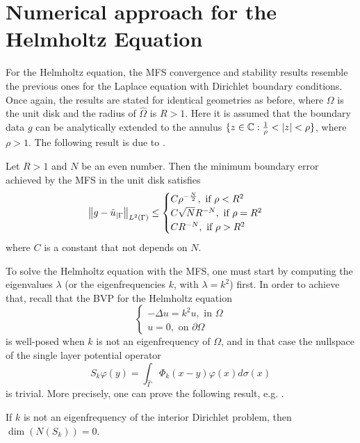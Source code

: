 \section{Numerical approach for the Helmholtz Equation}
For the Helmholtz equation, the \ac{MFS} convergence and stability results resemble the previous ones for the Laplace equation with Dirichlet boundary conditions. Once again, the results are stated for identical geometries as before, where \(\Omega\) is the unit disk and the radius of \(\hat{\Omega}\) is \(R>1\). Here it is assumed that the boundary data \(g\) can be analytically extended to the annulus \(\{z \in \mathbb{C}: \frac{1}{\rho}< \abs{z} < \rho\}\), where \(\rho > 1\). The following result is due to \cite{barnett2008stability}.
\begin{theorem}
    Let \(R > 1\) and \(N\) be an even number. Then the minimum boundary error achieved by the \ac{MFS} in the unit disk satisfies
    \[
        \norm{g - \tilde{u}_{|\Gamma}}_{L^2(\Gamma)} \leq 
        \begin{cases}
            C \rho^{-\frac{N}{2}}, \text{ if } \rho < R^2\\
            C \sqrt{N} R^{-N}, \text{ if } \rho = R^2\\
            C R^{-N}, \text{ if } \rho > R^2\\
        \end{cases}
    \]
    where \(C\) is a constant that not depends on \(N\).
\end{theorem}
To solve the Helmholtz equation with the \ac{MFS}, one must start by computing the eigenvalues \(\lambda\) (or the eigenfrequencies \(k\), with \(\lambda = k^2\)) first. In order to achieve that, recall that the \ac{BVP} for the Helmholtz equation
\begin{equation}\label{helm_dirichlet}
    \begin{cases}
        -\Delta u = k^2 u, \text{ in } \Omega\\
        u = 0, \text{ on } \partial \Omega
    \end{cases}
\end{equation}
is well-posed when \(k\) is not an eigenfrequency of \(\Omega\), and in that case the nullspace of the single layer potential operator
\[
    S_k \varphi(y) = \int_{\hat{\Gamma}} \Phi_k(x-y)\varphi(x) d\sigma(x) 
\]
is trivial. More precisely, one can prove the following result, e.g. \cite{alves2005method}.
\begin{theorem}\label{MFS_helm_null_kern}
    If \(k\) is not an eigenfrequency of the interior Dirichlet problem, then \(\dim \left(N(S_k)\right)=0\).
\end{theorem}
